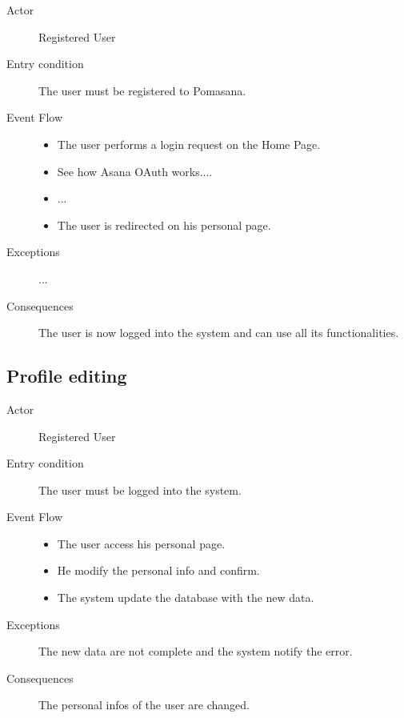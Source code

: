			\begin{description}

				\item[Actor] Registered User
			
				\item[Entry condition] The user must be registered to Pomasana.

				\item[Event Flow]\hfill

					\begin{itemize}

						\item The user performs a login request on the Home Page.

						\item See how Asana OAuth works....

						\item ...

						\item The user is redirected on his personal page.

					\end{itemize}

				\item[Exceptions] ...

				\item[Consequences] The user is now logged into the system and can use all its functionalities.

			\end{description}

		\subsection{Profile editing}

			\begin{description}

				\item[Actor] Registered User
			
				\item[Entry condition] The user must be logged into the system.

				\item[Event Flow]\hfill

					\begin{itemize}

						\item The user access his personal page.

						\item He modify the personal info and confirm.

						\item The system update the database with the new data.

					\end{itemize}

				\item[Exceptions] The new data are not complete and the system notify the error.

				\item[Consequences] The personal infos of the user are changed.

			\end{description}

